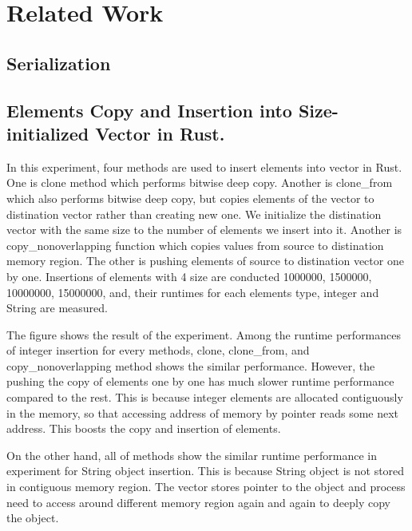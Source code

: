 \chapter{Related Work}
\label{chapter:relatedwork}
\thispagestyle{myheadings}

\graphicspath{{2_RelatedWork/Figures/}}

\label{sec:history}

\clearpage

\section{Serialization}
\label{sec:history}

\clearpage



\section{Elements Copy and Insertion into Size-initialized Vector in Rust.}
\label{sec:history}
In this experiment, four methods are used to insert elements into vector in Rust. One is clone method which performs bitwise deep copy. 
Another is clone\_from which also performs bitwise deep copy, but copies elements of the vector to distination vector rather than 
creating new one. We initialize the distination vector with the same size to the number of elements we insert into it. 
Another is copy\_nonoverlapping function which copies values from source to distination memory region. 
The other is pushing elements of source to distination vector one by one. Insertions of elements with 4 size are conducted 1000000, 1500000, 10000000, 15000000, and, 
their runtimes for each elements type, integer and String are measured. 


The figure shows the result of the experiment. Among the runtime performances of integer insertion for every methods, 
clone, clone\_from, and copy\_nonoverlapping method shows the similar performance. However, the pushing the copy of elements one by one has much slower runtime performance 
compared to the rest. This is because integer elements are allocated contiguously in the memory, so that accessing address of memory by pointer reads some next address. 
This boosts the copy and insertion of elements. 

On the other hand, all of methods show the similar runtime performance in experiment for String object insertion. 
This is because String object is not stored in contiguous memory region. The vector stores pointer to the object and 
process need to access around different memory region again and again to deeply copy the object.

